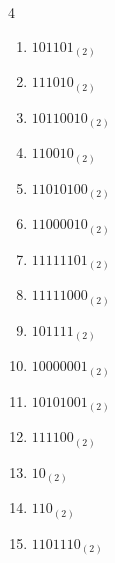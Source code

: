 \begin{multicols}{4}
\begin{enumerate}
        \phantom{$=172$}

  \item $101101_{(2)}$

        \phantom{$=45$}

\columnbreak %

\resetques

  \item $111010_{(2)}$

        \phantom{$=58$}

  \item $10110010_{(2)}$

        \phantom{$=178$}

  \item $110010_{(2)}$

        \phantom{$=50$}

  \item $11010100_{(2)}$

        \phantom{$=212$}

  \item $11000010_{(2)}$

        \phantom{$=194$}

  \item $11111101_{(2)}$

        \phantom{$=253$}

  \item $11111000_{(2)}$

        \phantom{$=248$}

  \item $101111_{(2)}$

        \phantom{$=47$}

  \item $10000001_{(2)}$

        \phantom{$=129$}

  \item $10101001_{(2)}$

        \phantom{$=169$}

  \item $111100_{(2)}$

        \phantom{$=60$}

  \item $10_{(2)}$

        \phantom{$=2$}

  \item $110_{(2)}$

        \phantom{$=6$}

  \item $1101110_{(2)}$


\end{enumerate}
\end{multicols}
